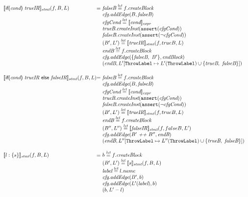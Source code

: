 \[\begin{array}{l@{}l@{~}l}
\transfun{\ircfgif{\emph{cond}}{\emph{trueIR}}}_{\emph{stmt}}(f, B, L)
& = & \emph{falseB} \letval f.\emph{createBlock}\\
& & \emph{cfg}.\emph{addEdge}(B, \emph{falseB})\\
& & \emph{cfgCond} \letval \transfun{\emph{cond}}_{\emph{expr}}\\
& & \emph{trueB}.\emph{createInst}(\TT{assert}(\emph{cfgCond}))\\
& & \emph{falseB}.\emph{createInst}(\TT{assert}(\neg \emph{cfgCond}))\\
& & (B', L') \letval \transfun{\emph{trueIR}}_{\emph{stmt}}(f, trueB, L)\\
& & \emph{endB} \letval f.\emph{createBlock}\\
& & \emph{cfg}.\emph{addEdge}(\{ \emph{falseB},\ B' \}, \emph{endBlock})\\
& & (\emph{endB}, L'[\ThrowLabel \mapsto L'(\ThrowLabel) \cup \{ \emph{trueB},\ \emph{falseB} \}])\\
& & \\

\transfun{\irifelse{\emph{cond}}{\emph{trueIR}}{\emph{falseIR}}}_{\emph{stmt}}(f, B, L)
& = & \emph{falseB} \letval f.\emph{createBlock}\\
& & \emph{cfg}.\emph{addEdge}(B, \emph{falseB})\\
& & \emph{cfgCond} \letval \transfun{\emph{cond}}_{\emph{expr}}\\
& & \emph{trueB}.\emph{createInst}(\TT{assert}(\emph{cfgCond}))\\
& & \emph{falseB}.\emph{createInst}(\TT{assert}(\neg \emph{cfgCond}))\\
& & (B', L') \letval \transfun{\emph{trueIR}}_{\emph{stmt}}(f, trueB, L)\\
& & \emph{endB} \letval f.\emph{createBlock}\\
& & (B'', L'') \letval \transfun{\emph{falseIR}}_{\emph{stmt}}(f, falseB, L')\\
& & \emph{cfg}.\emph{addEdge}(B' ~\emph{++}~ B'', \emph{endB})\\
& & (\emph{endB}, L''[\ThrowLabel \mapsto L''(\ThrowLabel) \cup \{ \emph{trueB},\ \emph{falseB} \}])\\
& & \\

\transfun{\irlabel{l}{s}}_{\emph{stmt}}(f, B, L)
& = & b \letval f.\emph{createBlock}\\
& & (B', L') \letval \transfun{s}_{\emph{stmt}}(f, B, L)\\
& & \emph{label} \letval l.\emph{name}\\
& & \emph{cfg}.\emph{addEdge}(B', b)\\
& & \emph{cfg}.\emph{addEdge}(L'(\emph{label}), b)\\
& & (b, L' - l)\\
& & \\


\end{array}\]

